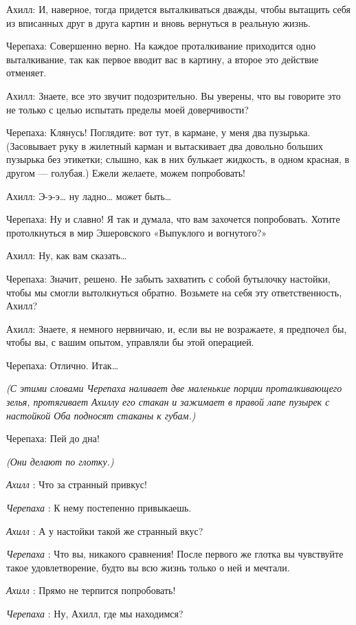 Ахилл: И, наверное, тогда придется выталкиваться дважды, чтобы вытащить себя из вписанных друг в друга картин и вновь вернуться в реальную жизнь.

Черепаха: Совершенно верно. На каждое проталкивание приходится одно выталкивание, так как первое вводит вас в картину, а второе это действие отменяет.

Ахилл: Знаете, все это звучит подозрительно. Вы уверены, что вы говорите это не только с целью испытать пределы моей доверчивости?

Черепаха: Клянусь! Поглядите: вот тут, в кармане, у меня два пузырька. (Засовывает руку в жилетный карман и вытаскивает два довольно больших пузырька без этикетки; слышно, как в них булькает жидкость, в одном красная, в другом --- голубая.) Ежели желаете, можем попробовать!

Ахилл: Э-э-э\ldots{} ну ладно\ldots{} может быть\ldots{}

Черепаха: Ну и славно! Я так и думала, что вам захочется попробовать. Хотите протолкнуться в мир Эшеровского «Выпуклого и вогнутого?»

Ахилл: Ну, как вам сказать\ldots{}

Черепаха: Значит, решено. Не забыть захватить с собой бутылочку настойки, чтобы мы смогли вытолкнуться обратно. Возьмете на себя эту ответственность, Ахилл?

Ахилл: Знаете, я немного нервничаю, и, если вы не возражаете, я предпочел бы, чтобы вы, с вашим опытом, управляли бы этой операцией.

Черепаха: Отлично. Итак\ldots{}

\emph{(С этими словами Черепаха наливает две маленькие порции проталкивающего зелья, протягивает Ахиллу его стакан и зажимает в правой лапе пузырек с настойкой Оба подносят стаканы к губам.)}

Черепаха: Пей до дна!

\emph{(Они делают по глотку.)}

\emph{Ахилл} : Что за странный привкус!

\emph{Черепаха} : К нему постепенно привыкаешь.

\emph{Ахилл} : А у настойки такой же странный вкус?

\emph{Черепаха} : Что вы, никакого сравнения! После первого же глотка вы чувствуйте такое удовлетворение, будто вы всю жизнь только о ней и мечтали.

\emph{Ахилл} : Прямо не терпится попробовать!

\emph{Черепаха} : Ну, Ахилл, где мы находимся?

